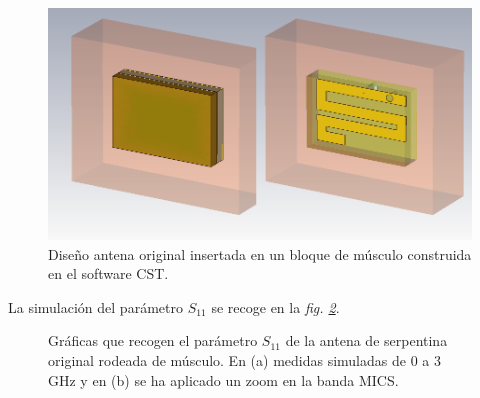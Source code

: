 \begin{figure}[!htb]
    \centering
    \includegraphics[scale=0.25]{./Simulaciones/original_antenna_muscle/original_serpentine_muscle_copy}
    \caption{Diseño antena original insertada en un bloque de músculo construida en el software CST.}
    \label{fig:fig5.9}
\end{figure}

\clearpage

La simulación del parámetro $S_{11}$ se recoge en la \textit{fig. \ref{fig:fig5.10}}.

\begin{figure}[!htb]
    \centering
    \caption{Gráficas que recogen el parámetro $S_{11}$ de la antena de serpentina original rodeada de músculo. En (a) medidas simuladas de 0 a 3 GHz y en (b) se ha aplicado un zoom en la banda MICS.}
    \label{fig:fig5.10}
\end{figure}

